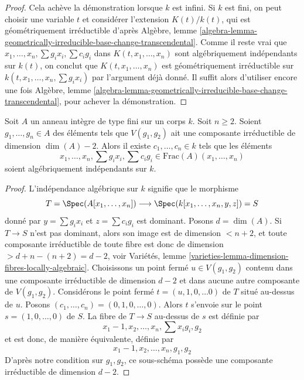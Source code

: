 \begin{proof}
\medskip\noindent
Cela achève la démonstration lorsque $k$ est infini. Si $k$ est fini,
on peut choisir une variable $t$ et considérer l'extension
$K(t)/k(t)$, qui est géométriquement irréductible d'après
Algèbre, lemme
\ref{algebra-lemma-geometrically-irreducible-base-change-transcendental}.
Comme il reste vrai que
$x_1, \ldots, x_n, \sum g_ix_i, \sum c_ig_i$
dans $K(t, x_1, \ldots, x_n)$ sont algébriquement indépendants sur $k(t)$,
on conclut que $K(t, x_1, \ldots, x_n)$
est géométriquement irréductible sur
$k(t, x_1, \ldots, x_n, \sum g_ix_i)$
par l'argument déjà donné.
Il suffit alors d'utiliser encore une fois Algèbre, lemme
\ref{algebra-lemma-geometrically-irreducible-base-change-transcendental},
pour achever la démonstration.
\end{proof}

\begin{lemma}
\label{lemma-algebraically-independent}
Soit $A$ un anneau intègre de type fini sur un corps $k$. Soit $n \geq 2$.
Soient $g_1, \ldots, g_n \in A$ des éléments tels que $V(g_1, g_2)$
ait une composante irréductible de dimension $\dim(A) - 2$.
Alors il existe $c_1, \ldots, c_n \in k$ tels que les éléments
$$
x_1, \ldots, x_n, \sum g_ix_i, \sum c_ig_i \in
\text{Frac}(A)(x_1, \ldots, x_n)
$$
soient algébriquement indépendants sur $k$.
\end{lemma}

\begin{proof}
L'indépendance algébrique sur $k$ signifie que le morphisme
$$
T = \Spec(A[x_1, \ldots, x_n])
\longrightarrow
\Spec(k[x_1, \ldots, x_n, y, z]) = S
$$
donné par $y = \sum g_ix_i$ et $z = \sum c_ig_i$ est dominant.
Posons $d = \dim(A)$. Si $T \to S$ n'est pas dominant, alors son image
est de dimension $< n + 2$, et toute composante irréductible
de toute fibre est donc de dimension $> d + n - (n + 2) = d - 2$, voir
Variétés, lemme
\ref{varieties-lemma-dimension-fibres-locally-algebraic}.
Choisissons un point fermé $u \in V(g_1, g_2)$ contenu dans une composante irréductible
de dimension $d - 2$ et dans aucune autre composante de $V(g_1, g_2)$.
Considérons le point fermé $t = (u, 1, 0, \ldots 0)$
de $T$ situé au-dessus de $u$. Posons $(c_1, \ldots, c_n) = (0, 1, 0, \ldots, 0)$.
Alors $t$ s'envoie sur le point $s = (1, 0, \ldots, 0)$ de $S$.
La fibre de $T \to S$ au-dessus de $s$ est définie par
$$
x_1 - 1, x_2, \ldots, x_n, \sum x_ig_i, g_2
$$
et est donc, de manière équivalente, définie par
$$
x_1 - 1, x_2, \ldots, x_n, g_1, g_2
$$
D'après notre condition sur $g_1, g_2$, ce sous-schéma possède une composante irréductible
de dimension $d - 2$.
\end{proof}

